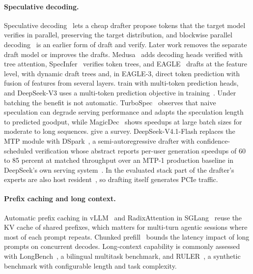 \paragraph{Speculative decoding.}
Speculative decoding~\citep{leviathan2023speculative,chen2023accelerating} lets a cheap drafter propose tokens that the
target model verifies in parallel, preserving the target distribution, and blockwise parallel
decoding~\citep{stern2018blockwise} is an earlier form of draft and verify. Later work removes the separate draft model
or improves the drafts. Medusa~\citep{cai2024medusa} adds decoding heads verified with tree attention,
SpecInfer~\citep{miao2024specinfer} verifies token trees, and EAGLE~\citep{li2024eagle,li2024eagle2,li2025eagle3}
drafts at the feature level, with dynamic draft trees and, in EAGLE-3, direct token prediction with fusion of features
from several layers. \citet{gloeckle2024multitoken} train with multi-token prediction heads, and DeepSeek-V3 uses a
multi-token prediction objective in training~\citep{deepseekai2024v3}. Under batching the benefit is not automatic.
TurboSpec~\citep{liu2024turbospec} observes that naive speculation can degrade serving performance and adapts the
speculation length to predicted goodput, while MagicDec~\citep{sadhukhan2025magicdec} shows speedups at large batch
sizes for moderate to long sequences. \citet{xia2024unlocking} give a survey. DeepSeek-V4.1-Flash replaces the MTP
module with DSpark~\citep{deepseekai2026v41flash}, a semi-autoregressive drafter with confidence-scheduled
verification whose abstract reports per-user generation speedups of 60 to 85 percent at matched throughput over an
MTP-1 production baseline in DeepSeek's own serving system~\citep{cheng2026dspark}. In the evaluated stack part of the
drafter's experts are also host resident~\citep{diffbot2026dsv41exl3}, so drafting itself generates PCIe traffic.

\paragraph{Prefix caching and long context.}
Automatic prefix caching in vLLM~\citep{vllm2026prefixcaching} and RadixAttention in SGLang~\citep{zheng2024sglang}
reuse the KV cache of shared prefixes, which matters for multi-turn agentic sessions where most of each prompt repeats.
Chunked prefill~\citep{agrawal2024sarathi} bounds the latency impact of long prompts on concurrent decodes.
Long-context capability is commonly assessed with LongBench~\citep{bai2024longbench}, a bilingual multitask benchmark,
and RULER~\citep{hsieh2024ruler}, a synthetic benchmark with configurable length and task complexity.


